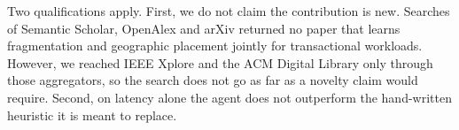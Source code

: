 Two qualifications apply. First, we do not claim the contribution is new. Searches of Semantic Scholar, OpenAlex and arXiv returned no paper that learns
fragmentation and geographic placement jointly for transactional workloads.
However, we reached IEEE Xplore and the ACM Digital Library only through those
aggregators, so the search does not go as far as a novelty claim would
require. Second, on latency alone the agent does not outperform the
hand-written heuristic it is meant to replace.
